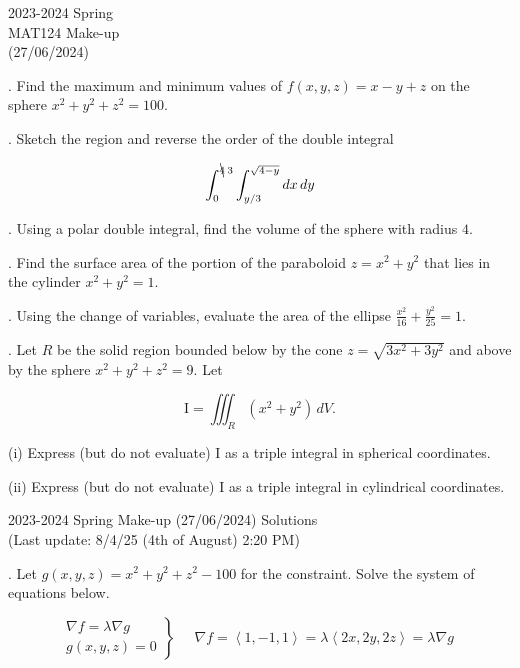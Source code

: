 \documentclass{article}
\begin{document}
\pagestyle{empty}
\large

\begin{center}
2023-2024 Spring \\MAT124 Make-up\\(27/06/2024)
\end{center}

. Find the maximum and minimum values of $f(x,y,z)=x-y+z$ on the sphere $x^2+y^2+z^2=100$.

\hfill

. Sketch the region and reverse the order of the double integral

\[\int_0^{\bcancel4\:3}\int_{y/3}^{\sqrt{4-y}}dx\,dy\]

\hfill

. Using a polar double integral, find the volume of the sphere with radius $4$.

\hfill

. Find the surface area of the portion of the paraboloid $z=x^2+y^2$ that lies in the cylinder $x^2+y^2=1$.

\hfill

. Using the change of variables, evaluate the area of the ellipse $\displaystyle\frac{x^2}{16}+\frac{y^2}{25}=1$.

\hfill

. Let $R$ be the solid region bounded below by the cone $z=\sqrt{3x^2+3y^2}$ and above by the sphere $x^2+y^2+z^2=9$. Let

\[\mathrm{I}=\iiint_R(x^2+y^2)\,dV.\]

\hfill

\noindent (i) Express (but do not evaluate) $\mathrm{I}$ as a triple integral in spherical coordinates.

\hfill

\noindent (ii) Express (but do not evaluate) $\mathrm{I}$ as a triple integral in cylindrical coordinates.

\newpage

\begin{center}
2023-2024 Spring Make-up (27/06/2024) Solutions\\
(Last update: 8/4/25 (4th of August) 2:20 PM)
\end{center}

. Let $g(x,y,z)=x^2+y^2+z^2-100$ for the constraint. Solve the system of equations below.

\[
\left.
\begin{array}{l}
\displaystyle\nabla f=\lambda\nabla g \\
\displaystyle g(x,y,z)=0
\end{array}
\right\}\quad
\begin{array}{c}
\nabla f=\left\langle1,-1,1\right\rangle=\lambda\left\langle2x,2y,2z\right\rangle=\lambda\nabla g
\end{array}
\]
\end{document}
